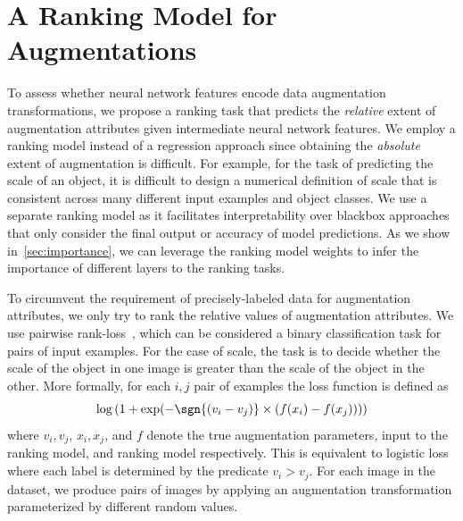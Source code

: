 %
%
\section{A Ranking Model for Augmentations}
To assess whether neural network features encode data augmentation transformations, we propose a ranking task that predicts the \textit{relative} extent of augmentation attributes given intermediate neural network features.
We employ a ranking model instead of a regression approach since obtaining the \textit{absolute} extent of augmentation is difficult.
For example, for the task of predicting the scale of an object, it is difficult to design a numerical definition of scale that is consistent across many different input examples and object classes.
We use a separate ranking model as it facilitates interpretability over blackbox approaches that only consider the final output or accuracy of model predictions.
As we show in~\autoref{sec:importance}, we can leverage the ranking model weights to infer the importance of different layers to the ranking tasks.

\label{sec:ranking_tasks}
To circumvent the requirement of precisely-labeled data for augmentation attributes, we only try to rank the relative values of augmentation attributes.
We use pairwise rank-loss~\cite{chen2009ranking}, which can be considered a binary classification task for pairs of input examples.
For the case of scale, the task is to decide whether the scale of the object in one image is greater than the scale of the object in the other.
More formally, for each $i,j$ pair of examples the loss function is defined as
$$\log{(1 + \exp(-\sgn{(v_i - v_j)} \times (f(x_i)-f(x_j))}))$$
where $v_i, v_j$, $x_i, x_j$, and $f$ denote the true augmentation parameters, input to the ranking model, and ranking model respectively.
This is equivalent to logistic loss where each label is determined by the predicate $v_i > v_j$.
For each image in the dataset, we produce pairs of images by applying an augmentation transformation parameterized by different random values.

